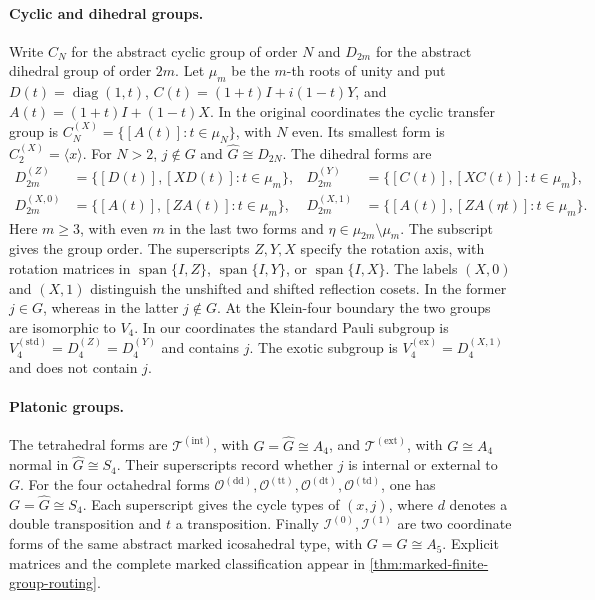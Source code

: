\documentclass[11pt,letterpaper,onecolumn]{article}
\theoremstyle{plain}
\theoremstyle{definition}
\theoremstyle{remark}
\newcommand{\DihZ}[1]{{D_{#1}^{(Z)}}}
\newcommand{\DihY}[1]{{D_{#1}^{(Y)}}}
\newcommand{\DihXzero}[1]{{D_{#1}^{(X,0)}}}
\newcommand{\DihXone}[1]{{D_{#1}^{(X,1)}}}
\newcommand{\CycX}[1]{{C_{#1}^{(X)}}}
\newcommand{\KleinStd}{{V_4^{(\mathrm{std})}}}
\newcommand{\KleinEx}{{V_4^{(\mathrm{ex})}}}
\newcommand{\TetInt}{{\mathcal T^{(\mathrm{int})}}}
\newcommand{\TetExt}{{\mathcal T^{(\mathrm{ext})}}}
\newcommand{\OctDD}{{\mathcal O^{(\mathrm{dd})}}}
\newcommand{\OctTT}{{\mathcal O^{(\mathrm{tt})}}}
\newcommand{\OctDT}{{\mathcal O^{(\mathrm{dt})}}}
\newcommand{\OctTD}{{\mathcal O^{(\mathrm{td})}}}
\newcommand{\IcoZero}{{\mathcal I^{(0)}}}
\newcommand{\IcoOne}{{\mathcal I^{(1)}}}
\newcommand{\diag}{\operatorname{diag}}
\newcommand{\Span}{\operatorname{span}}
\begin{document}
\paragraph{Cyclic and dihedral groups.}
Write \(C_N\) for the abstract cyclic group of order \(N\) and
\(D_{2m}\) for the abstract dihedral group of order \(2m\).
Let \(\mu_m\) be the \(m\)-th roots of unity and put
\(D(t)=\diag(1,t)\), \(C(t)=(1+t)I+i(1-t)Y\), and
\(A(t)=(1+t)I+(1-t)X\). In the original coordinates the cyclic
transfer group is \(\CycX{N}=\{[A(t)]:t\in\mu_N\}\), with \(N\)
even. Its smallest form is \(\CycX{2}=\langle x\rangle\). For \(N>2\),
\(j\notin G\) and \(\widehat G\cong D_{2N}\). The dihedral forms are
\[
\begin{aligned}
 \DihZ{2m}&=\{[D(t)],[XD(t)]:t\in\mu_m\},&
 \DihY{2m}&=\{[C(t)],[XC(t)]:t\in\mu_m\},\\
 \DihXzero{2m}&=\{[A(t)],[ZA(t)]:t\in\mu_m\},&
 \DihXone{2m}&=\{[A(t)],[ZA(\eta t)]:t\in\mu_m\}.
\end{aligned}
\]
Here \(m\ge3\), with even \(m\) in the last two forms and
\(\eta\in\mu_{2m}\setminus\mu_m\). The subscript gives the group order.
The superscripts \(Z,Y,X\) specify the rotation axis, with rotation
matrices in \(\Span\{I,Z\}\), \(\Span\{I,Y\}\), or \(\Span\{I,X\}\).
The labels \((X,0)\) and \((X,1)\) distinguish the unshifted and shifted
reflection cosets. In the former \(j\in G\), whereas in the latter
\(j\notin G\). At the Klein-four boundary the two groups are
isomorphic to \(V_4\). In our coordinates the standard Pauli subgroup is
\(\KleinStd=\DihZ{4}=\DihY{4}\) and contains \(j\). The exotic subgroup
is \(\KleinEx=\DihXone{4}\) and does not contain \(j\).

\paragraph{Platonic groups.}
The tetrahedral forms are \(\TetInt\), with \(G=\widehat G\cong A_4\), and
\(\TetExt\), with \(G\cong A_4\) normal in \(\widehat G\cong S_4\).
Their superscripts record whether \(j\) is internal or external to \(G\).
For the four octahedral forms \(\OctDD,\OctTT,\OctDT,\OctTD\),
one has \(G=\widehat G\cong S_4\). Each superscript gives the cycle types of
\((x,j)\), where \(d\) denotes a double transposition and \(t\) a
transposition. Finally \(\IcoZero,\IcoOne\) are two coordinate forms
of the same abstract marked icosahedral type, with \(G=\widehat G\cong A_5\).
Explicit matrices and the complete marked classification appear in
\cref{thm:marked-finite-group-routing}.
\end{document}
